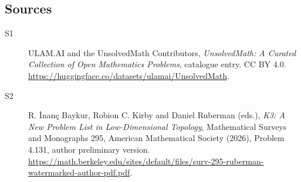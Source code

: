 \documentclass[11pt]{article}
\begin{document}
\subsection{Sources}
\begin{description}
\item[\hypertarget{source:statement:1}{S1}] ULAM.AI and the UnsolvedMath Contributors, \emph{UnsolvedMath: A Curated Collection of Open Mathematics Problems}, catalogue entry. CC BY 4.0. \url{https://huggingface.co/datasets/ulamai/UnsolvedMath}.
\item[\hypertarget{source:statement:2}{S2}] R. İnanç Baykur, Robion C. Kirby and Daniel Ruberman (eds.), \emph{K3: A New Problem List in Low-Dimensional Topology}, Mathematical Surveys and Monographs 295, American Mathematical Society (2026), Problem 4.131, author preliminary version. \url{https://math.berkeley.edu/sites/default/files/surv-295-ruberman-watermarked-author-pdf.pdf}.
\end{description}
\label{end:statement}
\end{document}
